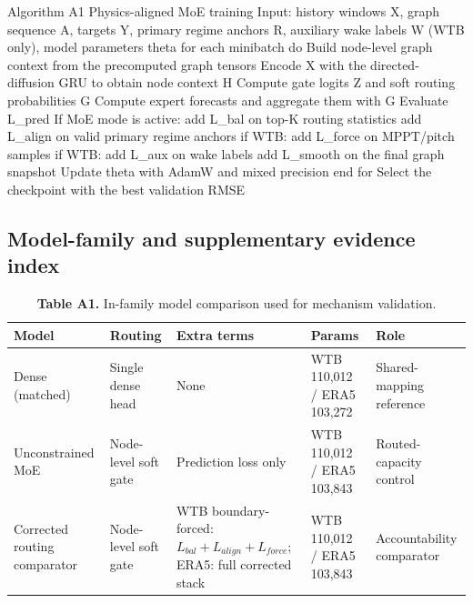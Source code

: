 \documentclass[
  11pt]{article}
\newenvironment{Shaded}{}{}
\newcommand{\NormalTok}[1]{#1}
\begin{document}
\begin{Shaded}
\begin{Highlighting}[]
\NormalTok{Algorithm A1  Physics{-}aligned MoE training}
\NormalTok{Input: history windows X, graph sequence A, targets Y, primary regime anchors R,}
\NormalTok{       auxiliary wake labels W (WTB only), model parameters theta}
\NormalTok{for each minibatch do}
\NormalTok{    Build node{-}level graph context from the precomputed graph tensors}
\NormalTok{    Encode X with the directed{-}diffusion GRU to obtain node context H}
\NormalTok{    Compute gate logits Z and soft routing probabilities G}
\NormalTok{    Compute expert forecasts and aggregate them with G}
\NormalTok{    Evaluate L\_pred}
\NormalTok{    If MoE mode is active:}
\NormalTok{        add L\_bal on top{-}K routing statistics}
\NormalTok{        add L\_align on valid primary regime anchors}
\NormalTok{        if WTB: add L\_force on MPPT/pitch samples}
\NormalTok{        if WTB: add L\_aux on wake labels}
\NormalTok{        add L\_smooth on the final graph snapshot}
\NormalTok{    Update theta with AdamW and mixed precision}
\NormalTok{end for}
\NormalTok{Select the checkpoint with the best validation RMSE}
\end{Highlighting}
\end{Shaded}

\subsection*{Model-family and supplementary evidence
index}\label{model-family-and-supplementary-evidence-index}

\begin{table}[H]
\centering
\small
\setlength{\tabcolsep}{5pt}
\renewcommand{\arraystretch}{1.1}
\caption*{\textbf{Table A1.} In-family model comparison used for mechanism validation.}
\begin{tabularx}{0.98\textwidth}{>{\raggedright\arraybackslash}p{} >{\raggedright\arraybackslash}p{} >{\raggedright\arraybackslash}X >{\raggedright\arraybackslash}p{} >{\raggedright\arraybackslash}p{}}
\toprule
Model & Routing & Extra terms & Params & Role \\
\midrule
Dense (matched) & Single dense head & None & WTB 110,012 / ERA5 103,272 & Shared-mapping reference \\
Unconstrained MoE & Node-level soft gate & Prediction loss only & WTB 110,012 / ERA5 103,843 & Routed-capacity control \\
Corrected routing comparator & Node-level soft gate & WTB boundary-forced: $L_{bal}+L_{align}+L_{force}$; ERA5: full corrected stack & WTB 110,012 / ERA5 103,843 & Accountability comparator \\
\bottomrule
\end{tabularx}
\end{table}
\end{document}
